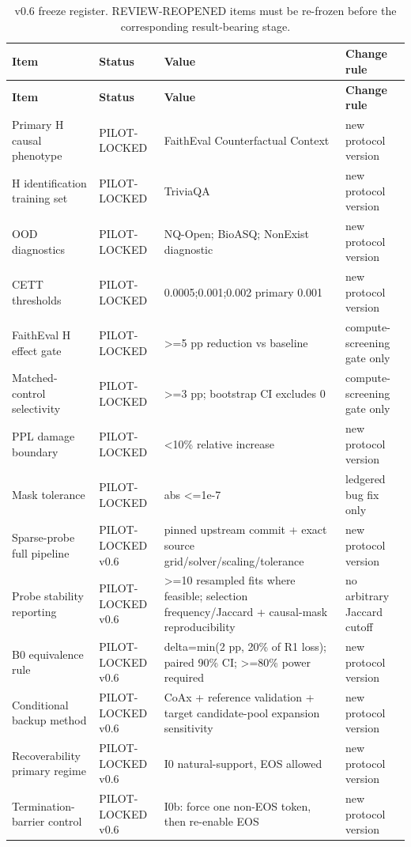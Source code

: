 \begin{longtable}{@{}p{}p{}p{}p{}@{}}
\caption{v0.6 freeze register. REVIEW-REOPENED items must be re-frozen before the corresponding result-bearing stage.}\label{tab:freeze-register}\\
\toprule
\textbf{Item} & \textbf{Status} & \textbf{Value} & \textbf{Change rule} \\
\midrule
\endfirsthead
\toprule
\textbf{Item} & \textbf{Status} & \textbf{Value} & \textbf{Change rule} \\
\midrule
\endhead
Primary H causal phenotype & PILOT-LOCKED & FaithEval Counterfactual Context & new protocol version \\
H identification training set & PILOT-LOCKED & TriviaQA & new protocol version \\
OOD diagnostics & PILOT-LOCKED & NQ-Open; BioASQ; NonExist diagnostic & new protocol version \\
CETT thresholds & PILOT-LOCKED & 0.0005;0.001;0.002 primary 0.001 & new protocol version \\
FaithEval H effect gate & PILOT-LOCKED & >=5 pp reduction vs baseline & compute-screening gate only \\
Matched-control selectivity & PILOT-LOCKED & >=3 pp; bootstrap CI excludes 0 & compute-screening gate only \\
PPL damage boundary & PILOT-LOCKED & <10\% relative increase & new protocol version \\
Mask tolerance & PILOT-LOCKED & abs <=1e-7 & ledgered bug fix only \\
Sparse-probe full pipeline & PILOT-LOCKED v0.6 & pinned upstream commit + exact source grid/solver/scaling/tolerance & new protocol version \\
Probe stability reporting & PILOT-LOCKED v0.6 & >=10 resampled fits where feasible; selection frequency/Jaccard + causal-mask reproducibility & no arbitrary Jaccard cutoff \\
B0 equivalence rule & PILOT-LOCKED v0.6 & delta=min(2 pp, 20\% of R1 loss); paired 90\% CI; >=80\% power required & new protocol version \\
Conditional backup method & PILOT-LOCKED v0.6 & CoAx + reference validation + target candidate-pool expansion sensitivity & new protocol version \\
Recoverability primary regime & PILOT-LOCKED v0.6 & I0 natural-support, EOS allowed & new protocol version \\
Termination-barrier control & PILOT-LOCKED v0.6 & I0b: force one non-EOS token, then re-enable EOS & new protocol version \\

\end{longtable}
